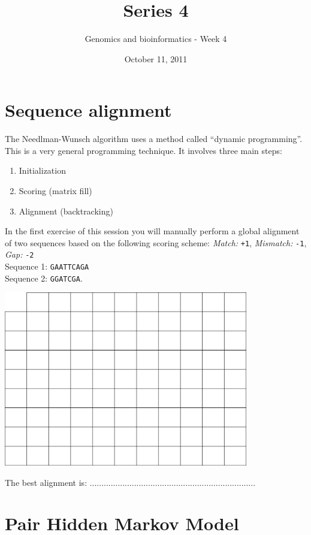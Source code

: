 \documentclass[a4paper,11pt]{article}
\title{Series 4}
\date{October 11, 2011}
\author{Genomics and bioinformatics - Week 4}
\begin{document}
\maketitle




\section{Sequence alignment}
The Needlman-Wunsch algorithm uses a method called ``dynamic programming''. This is a very general programming technique. It involves three main steps:
\begin{enumerate}
\item Initialization
\item Scoring (matrix fill)
\item Alignment (backtracking)
\end{enumerate}
In the first exercise of this session you will manually perform a global alignment of two sequences based on the following scoring scheme:
\emph{Match:} \texttt{+1}, \emph{Mismatch:} \texttt{-1}, \emph{Gap:} \texttt{-2}\\
Sequence 1: \texttt{GAATTCAGA}\\
Sequence 2: \texttt{GGATCGA}.
\vspace{0.5cm}
\begin{center}
\includegraphics[width=0.8\textwidth]{matrix.png}
\end{center}
\vspace{0.5cm}
The best alignment is: .......................................................................\\







\section{Pair Hidden Markov Model}
\end{document}

